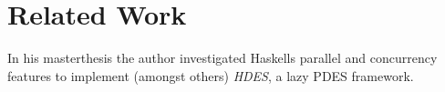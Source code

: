 \section{Related Work}
In his masterthesis \cite{bezirgiannis_improving_2013} the author investigated Haskells parallel and concurrency features to implement (amongst others) \textit{HDES}, a lazy PDES framework.